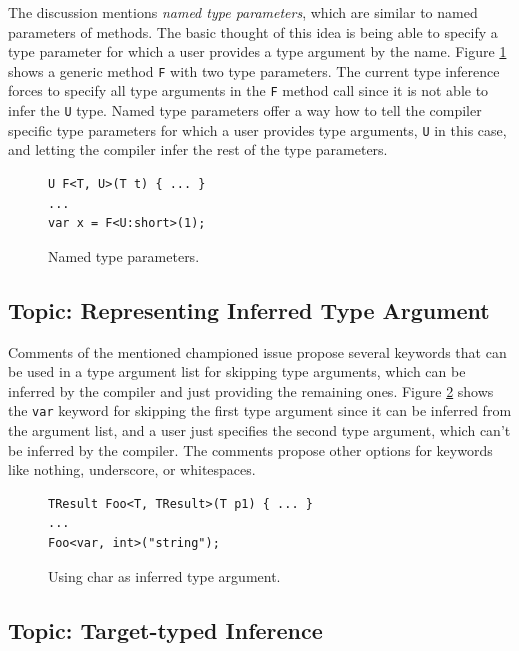 The discussion \cite{online:NamedTypeParam} mentions \textit{named type parameters}, which are similar to named parameters of methods. 
The basic thought of this idea is being able to specify a type parameter for which a user provides a type argument by the name. 
Figure \ref{img21:NamedTParam} shows a generic method \texttt{F} with two type parameters. 
The current type inference forces to specify all type arguments in the \texttt{F} method call since it is not able to infer the \texttt{U} type. 
Named type parameters offer a way how to tell the compiler specific type parameters for which a user provides type arguments, \texttt{U} in this case, and letting the compiler infer the rest of the type parameters.
\begin{figure}[h]
\begin{lstlisting}[style=csharp]
U F<T, U>(T t) { ... }
...
var x = F<U:short>(1);
\end{lstlisting}
\caption{Named type parameters.}
\label{img21:NamedTParam}
\end{figure}

\subsection{Topic: Representing Inferred Type Argument} \label{sect10:is4}

Comments of the mentioned championed issue \cite{online:champion} propose several keywords that can be used in a type argument list for skipping type arguments, which can be inferred by the compiler and just providing the remaining ones.
Figure \ref{img22:CharITArg} shows the \texttt{var} keyword for skipping the first type argument since it can be inferred from the argument list, and a user just specifies the second type argument, which can’t be inferred by the compiler. 
The comments propose other options for keywords like nothing, underscore, or whitespaces.
\begin{figure}[h]
\begin{lstlisting}[style=csharp]
TResult Foo<T, TResult>(T p1) { ... }
...
Foo<var, int>("string");
\end{lstlisting}
\caption{Using char as inferred type argument.}
\label{img22:CharITArg}
\end{figure}

\subsection{Topic: Target-typed Inference} \label{sect06:targetType}

